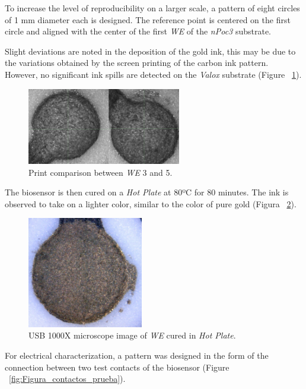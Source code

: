 To increase the level of reproducibility on a larger scale, a pattern of eight circles of 1 mm diameter each is designed. The reference point is centered on the first circle and aligned with the center of the first \emph{WE} of the \textit{nPoc3} substrate.

Slight deviations are noted in the deposition of the gold ink, this may be due to the variations obtained by the screen printing of the carbon ink pattern. However, no significant ink spills are detected on the \textit{Valox} substrate (Figure ~\ref{fig:Figura_impresion_8juntos}).

\begin{figure}[H]
  \centering
    \includegraphics[width=0.6\textwidth]{Figures/Figura_impresion_8juntos}
  \caption{Print comparison between \emph{WE} 3 and 5.}
  \label{fig:Figura_impresion_8juntos}
\end{figure}

The biosensor is then cured on a \textit{Hot Plate} at 80ºC for 80 minutes. The ink is observed to take on a lighter color, similar to the color of pure gold (Figura ~\ref{fig:Figura_impresion_curado}).

\begin{figure}[H]
  \centering
    \includegraphics[width=0.45\textwidth]{Figures/Figura_impresion_curado}
  \caption{USB 1000X microscope image of \emph{WE} cured in \textit{Hot Plate}.}
  \label{fig:Figura_impresion_curado}
\end{figure}

For electrical characterization, a pattern was designed in the form of the connection between two test contacts of the biosensor (Figure ~\ref{fig:Figura_contactos_prueba}).

